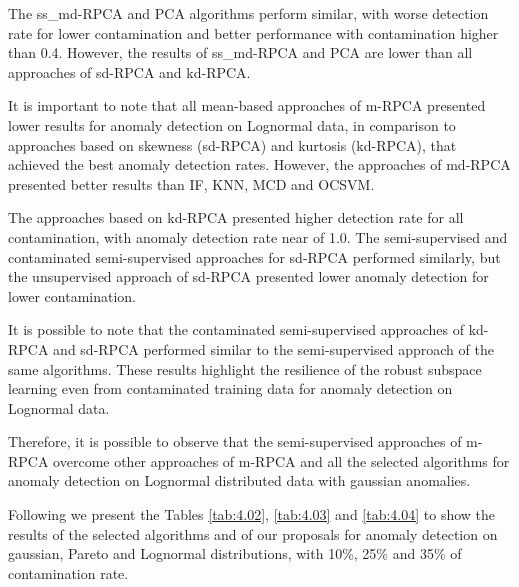 The ss\_md-RPCA and PCA algorithms perform similar, with worse detection rate for lower contamination and better performance with contamination higher than 0.4. However, the results of ss\_md-RPCA and PCA are lower than all approaches of sd-RPCA and kd-RPCA. 

It is important to note that all mean-based approaches of m-RPCA presented lower results for anomaly detection on Lognormal data, in comparison to approaches based on skewness (sd-RPCA) and kurtosis (kd-RPCA), that achieved the best anomaly detection rates. However, the approaches of md-RPCA presented better results than IF, KNN, MCD and OCSVM.

The approaches based on kd-RPCA presented higher detection rate for all contamination, with anomaly detection rate near of 1.0. The semi-supervised and contaminated semi-supervised approaches for sd-RPCA performed similarly, but the unsupervised approach of sd-RPCA presented lower anomaly detection for lower contamination.

It is possible to note that the contaminated semi-supervised approaches of kd-RPCA and sd-RPCA performed similar to the semi-supervised approach of the same algorithms. These results highlight the resilience of the robust subspace learning even from contaminated training data for anomaly detection on Lognormal data.

Therefore, it is possible to observe that the semi-supervised approaches of m-RPCA overcome other approaches of m-RPCA and all the selected algorithms for anomaly detection on Lognormal distributed data with gaussian anomalies.

Following we present the Tables \ref{tab:4.02},  \ref{tab:4.03} and \ref{tab:4.04} to show the results of the selected algorithms and of our proposals for anomaly detection on gaussian, Pareto and Lognormal distributions, with 10\%, 25\% and 35\% of contamination rate.

